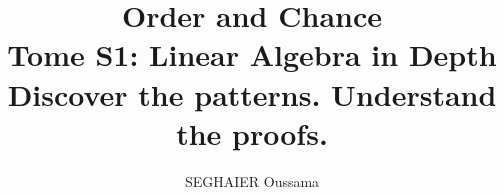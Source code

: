 \documentclass[11pt,openany]{book}
\title{\Huge\textbf{Order and Chance}\\[0.4em]\LARGE Tome S1: Linear Algebra in Depth\\[0.6em]
\Large Discover the patterns. Understand the proofs.}
\author{SEGHAIER Oussama}
\date{\the\year}
\begin{document}
\frontmatter
\makecover
\maketitle

\tableofcontents

\mainmatter













\end{document}
